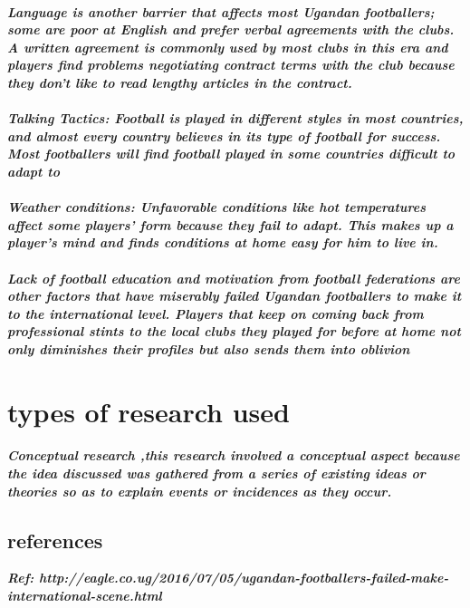 \documentclass[a4paper,12pt]{article}
\begin{document}
\paragraph {\sl Language is another barrier that affects most Ugandan footballers; some are poor at English and prefer verbal agreements with the clubs. A written agreement is commonly used by most clubs in this era and players find problems negotiating contract terms with the club because they don’t like to read lengthy articles in the contract.}
\paragraph{\sl Talking Tactics: Football is played in different styles in most countries, and almost every country believes in its type of football for success. Most footballers will find football played in some countries difficult to adapt to}
\paragraph{\sl Weather conditions: Unfavorable conditions like hot temperatures affect some players’ form because they fail to adapt. This makes up a player’s mind and finds conditions at home easy for him to live in.}
\paragraph{\sl Lack of football education and motivation from football federations are other factors that have miserably failed Ugandan footballers to make it to the international level.
Players that keep on coming back from professional stints to the local clubs they played for before at home not only diminishes their profiles but also sends them into oblivion
}
\section{\sc types of research used}
\paragraph{\sl Conceptual research ,this research involved a conceptual aspect  because  the idea discussed was gathered from a series of  existing ideas or theories so as to explain events or incidences as they occur.}
\subsection{\sc references}

\textbf{\sl 	
Ref: http://eagle.co.ug/2016/07/05/ugandan-footballers-failed-make-international-scene.html
}
\end{document}
